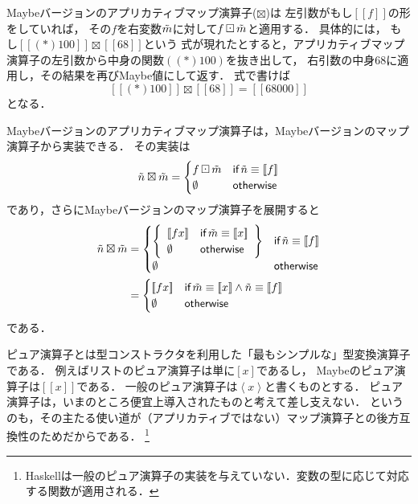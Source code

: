 \documentclass[a5paper,draft]{jsbook}
\def\[{\left[\!\left[}
\def\]{\right]\!\right]}
\newcommand{\programminglanguage}[1]{\textsf{#1}}
\newcommand{\haskell}{\programminglanguage{Haskell}}
\newcommand{\mathMaybeWith}[1]{\[#1\]}
\newcommand{\mathPureWith}[1]{\left\langle#1\right\rangle}
\newcommand{\mathMaybeVar}[1]{\Tilde{#1}}
\newcommand{\mathNothing}{\emptyset}%
\newcommand{\mathBinaryOperator}[1]{\operatorname{#1}}
\newcommand{\mathApplicativeMaybeMap}{\boxtimes}
\newcommand{\mathMaybeMap}{\mathBinaryOperator{\boxdot}}
\newcommand{\mathKeyword}[1]{\operatorname{\textsf{#1}}}
\newcommand{\mathIf}{\mathKeyword{if}}
\newcommand{\mathOtherwise}{\mathKeyword{otherwise}}
\begin{document}
Maybeバージョンのアプリカティブマップ演算子($\mathApplicativeMaybeMap$)は
左引数がもし$\mathMaybeWith{f}$の形をしていれば，
その$f$を右変数$\mathMaybeVar{m}$に対して$f\mathMaybeMap\mathMaybeVar{m}$と適用する．
具体的には，
もし$\mathMaybeWith{(*)100}\mathApplicativeMaybeMap{}\mathMaybeWith{68}$という
式が現れたとすると，アプリカティブマップ演算子の左引数から中身の関数$((*)100)$を抜き出して，
右引数の中身$68$に適用し，その結果を再びMaybe値にして返す．
式で書けば
$$
\mathMaybeWith{(*)100}\mathApplicativeMaybeMap{}\mathMaybeWith{68}=\mathMaybeWith{68000}
$$
となる．

Maybeバージョンのアプリカティブマップ演算子は，Maybeバージョンのマップ演算子から実装できる．
その実装は
\begin{equation}
\mathMaybeVar{n}\mathApplicativeMaybeMap\mathMaybeVar{m}=\begin{cases}
f\mathMaybeMap\mathMaybeVar{m}&\mathIf\mathMaybeVar{n}\equiv\mathMaybeWith{f}\\
\mathNothing&\mathOtherwise
\end{cases}
\end{equation}
であり，さらにMaybeバージョンのマップ演算子を展開すると
\begin{align*}
\mathMaybeVar{n}\mathApplicativeMaybeMap\mathMaybeVar{m}&=\begin{cases}
\left\{
\begin{array}{ll}
\mathMaybeWith{fx}&\mathIf\mathMaybeVar{m}\equiv\mathMaybeWith{x}\\
\mathNothing&\mathOtherwise
\end{array}\right\}&\mathIf\mathMaybeVar{n}\equiv\mathMaybeWith{f}\\
\mathNothing&\mathOtherwise
\end{cases}\\
&=\begin{cases}
\mathMaybeWith{fx}&\mathIf\mathMaybeVar{m}\equiv\mathMaybeWith{x}\wedge\mathMaybeVar{n}\equiv\mathMaybeWith{f}\\
\mathNothing&\mathOtherwise
\end{cases}
\end{align*}
である．

ピュア演算子とは型コンストラクタを利用した「最もシンプルな」型変換演算子である．
例えばリストのピュア演算子は単に$[x]$であるし，
Maybeのピュア演算子は$\mathMaybeWith{x}$である．
一般のピュア演算子は$\mathPureWith{x}$と書くものとする．
ピュア演算子は，いまのところ便宜上導入されたものと考えて差し支えない．
というのも，その主たる使い道が（アプリカティブではない）マップ演算子との後方互換性のためだからである．%
\footnote{\haskell は一般のピュア演算子の実装を与えていない．変数の型に応じて対応する関数が適用される．}
\end{document}
